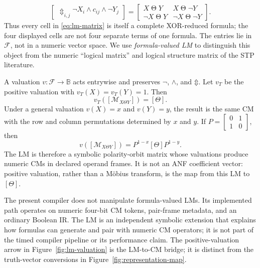 \documentclass[11pt]{article}
\newcommand{\Bool}{\mathbb{B}}
\newcommand{\Formula}{\mathcal{F}}
\newcommand{\XOR}{\mathbin{\Updownarrow}}
\newcommand{\CM}[1]{[#1]}
\begin{document}
{\begin{equation}
\begin{bmatrix}
    \mathop{\XOR}_{i,j}\neg X_i\wedge c_{ij}\wedge\neg Y_j
  \end{bmatrix}
  =
  \begin{bmatrix}
    X\mathbin{\Theta}Y & X\mathbin{\Theta}\neg Y\\
    \neg X\mathbin{\Theta}Y & \neg X\mathbin{\Theta}\neg Y
  \end{bmatrix}.
  \label{eq:lm-matrix}
\end{equation}
Thus every cell in \eqref{eq:lm-matrix} is itself a complete XOR-reduced
formula; the four displayed cells are not four separate terms of one formula.
The entries lie in $\Formula$, not
in a numeric vector space. We use \emph{formula-valued LM} to distinguish this
object from the numeric ``logical matrix'' and logical structure matrix of the
STP literature.

A valuation $v:\Formula\rightarrow\Bool$ acts entrywise and preserves
$\neg$, $\wedge$, and $\XOR$. Let $v_T$ be the positive valuation with
$v_T(X)=v_T(Y)=1$. Then
\begin{equation}
  v_T\!\left([\mathcal{M}_{X\Theta Y}]\right)=\CM{\Theta}.
  \label{eq:positive-valuation}
\end{equation}
Under a general valuation $v(X)=x$ and $v(Y)=y$, the result is the same CM with
the row and column permutations determined by $x$ and $y$. If
$P=\begin{bmatrix}0&1\\1&0\end{bmatrix}$, then
\begin{equation}
  v\!\left([\mathcal{M}_{X\Theta Y}]\right)
  =P^{1-x}\CM{\Theta}P^{1-y}.
  \label{eq:general-valuation}
\end{equation}
The LM is therefore a symbolic polarity-orbit matrix whose valuations produce
numeric CMs in declared operand frames. It is not an ANF coefficient vector:
positive valuation, rather than a M\"obius transform, is the map from this LM
to $\CM{\Theta}$.

The present compiler does not manipulate formula-valued LMs. Its implemented
path operates on numeric four-bit CM tokens, pair-frame metadata, and an
ordinary Boolean IR. The LM is an independent symbolic extension that explains
how formulas can generate and pair with numeric CM operators; it is not part of
the timed compiler pipeline or its performance claim. The positive-valuation
arrow in Figure~\ref{fig:lm-valuation} is the LM-to-CM bridge; it is distinct
from the truth-vector conversions in Figure~\ref{fig:representation-map}.

}
\end{document}
